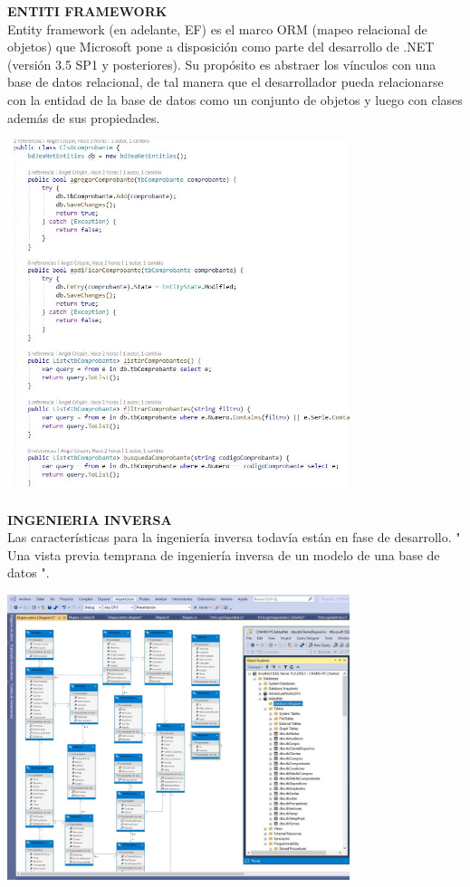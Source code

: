 \documentclass[12pt,letterpaper]{article}
\begin{document}
\textbf{ENTITI FRAMEWORK}
\\
Entity framework (en adelante, EF) es el marco ORM (mapeo relacional de objetos) que Microsoft pone a disposición como parte del desarrollo de .NET (versión 3.5 SP1 y posteriores). Su propósito es abstraer los vínculos con una base de datos relacional, de tal manera que el desarrollador pueda relacionarse con la entidad de la base de datos como un conjunto de objetos y luego con clases además de sus propiedades.
\\
\begin{center}
	\includegraphics[width=10cm]{./img/image12.jpg} 
\end{center}

\textbf{INGENIERIA INVERSA}
\\
Las características para la ingeniería inversa todavía están en fase de desarrollo. " Una vista previa temprana de ingeniería inversa de un modelo de una base de datos ".
\\
\begin{center}
	\includegraphics[width=10cm]{./img/image13.jpg} 
\end{center}
\end{document}
